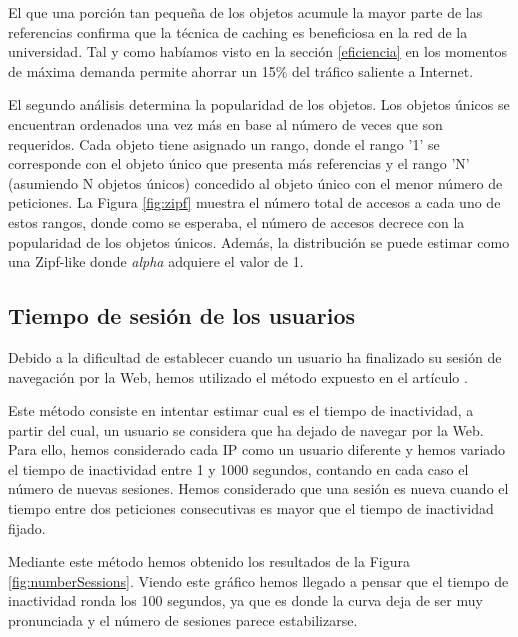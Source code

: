 \documentclass[twocolumn]{Jornadas}
\begin{document}
El que una porción tan pequeña de los objetos acumule la mayor parte de las referencias confirma que la técnica de caching es beneficiosa en la red de la universidad. Tal y como habíamos visto en la sección \ref{eficiencia} en los momentos de máxima demanda permite ahorrar un 15\% del tráfico saliente a Internet.

El segundo análisis determina la popularidad de los objetos. Los objetos únicos se encuentran ordenados una vez más en base al número de veces que son requeridos. Cada objeto tiene asignado un rango, donde el rango '1' se corresponde con el objeto único que presenta más referencias y el rango 'N' (asumiendo N objetos únicos) concedido al objeto único con el menor número de peticiones. La Figura \ref{fig:zipf} muestra el número total de accesos a cada uno de estos rangos, donde como se esperaba, el número de accesos decrece con la popularidad de los objetos únicos. Además, la distribución se puede estimar como una Zipf-like donde \emph{alpha} adquiere el valor de 1.

\subsection{Tiempo de sesión de los usuarios}
Debido a la dificultad de establecer cuando un usuario ha finalizado su sesión de navegación por la Web, hemos utilizado el método expuesto en el artículo \cite{adya2001analyzing}.

Este método consiste en intentar estimar cual es el tiempo de inactividad, a partir del cual, un usuario se considera que ha dejado de navegar por la Web. Para ello, hemos considerado cada IP como un usuario diferente y hemos variado el tiempo de inactividad entre 1 y 1000 segundos, contando en cada caso el número de nuevas sesiones. Hemos considerado que una sesión es nueva cuando el tiempo entre dos peticiones consecutivas es mayor que el tiempo de inactividad fijado.

Mediante este método hemos obtenido los resultados de la Figura \ref{fig:numberSessions}. Viendo este gráfico hemos llegado a pensar que el tiempo de inactividad ronda los 100 segundos, ya que es donde la curva deja de ser muy pronunciada y el número de sesiones parece estabilizarse.
\end{document}
